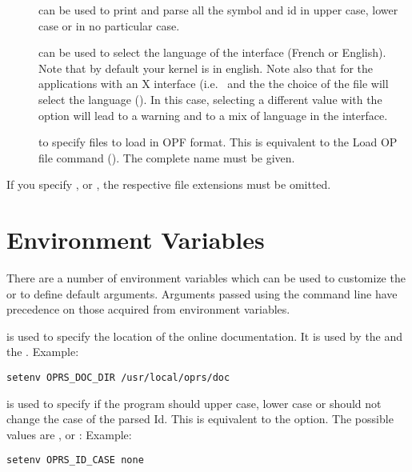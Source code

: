 \begin{description}
\item[] can be used to print and parse all the symbol
and id in upper case, lower case or in no particular case.

\item[] can be used to select the language of the interface
(French or English). Note that by default your kernel is in english. Note also
that for the applications with an X interface (i.e.\ \XPK{} and the \OPE{} the
choice of the  file will select the language
(). In this case, selecting a
different value with the option will lead to a warning and to a mix of language
in the interface.

\item[] to specify files to load in OPF format. This is
equivalent to the Load OP file command (). The
complete name must be given.

\end{description}

If you specify ,  or , the respective file
extensions must be omitted.


\section{\OPE{} Environment Variables}

There are a number of environment variables which can be used to customize the
\OPE{} or to define default arguments. Arguments passed using the command line
have precedence on those acquired from environment variables.

\begin{description}

\item[\code{OPRS\_DOC\_DIR}] is used  to specify the location of the online \COPRSDE{}
documentation. It is used by the \XPK{} and the \OPE{}.
Example:
\begin{verbatim}
setenv OPRS_DOC_DIR /usr/local/oprs/doc
\end{verbatim}

\item[\code{OPRS\_ID\_CASE}] is used to specify if the program should upper case,
lower case or should not change the case of the parsed Id. This is equivalent
to the  option. The possible values
are ,  or :\*
Example:
\begin{verbatim}
setenv OPRS_ID_CASE none
\end{verbatim}

\end{description}

